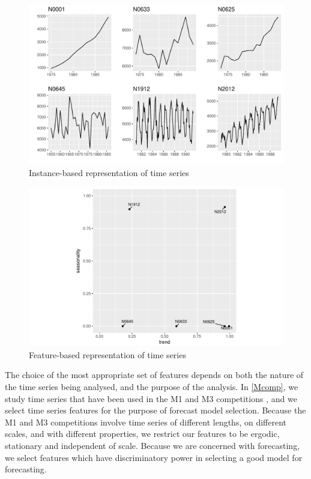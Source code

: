 \documentclass[11pt,a4paper,]{article}
\theoremstyle{definition}
\theoremstyle{definition}
\theoremstyle{definition}
\theoremstyle{remark}
\begin{document}
\begin{figure}

{\centering \includegraphics[width=\textwidth]{figure/fig1-1} 

}

\caption{Instance-based representation of time series}\label{fig:fig1}
\end{figure}

\begin{figure}

{\centering \includegraphics[width=0.7\linewidth]{figure/fig2-1} 

}

\caption{Feature-based representation of time series}\label{fig:fig2}
\end{figure}

The choice of the most appropriate set of features depends on both the
nature of the time series being analysed, and the purpose of the
analysis. In \autoref{Mcomp}, we study time series that have been used
in the M1 and M3 competitions
\autocites{makridakis1982accuracy}{makridakis2000m3}, and we select time
series features for the purpose of forecast model selection. Because the
M1 and M3 competitions involve time series of different lengths, on
different scales, and with different properties, we restrict our
features to be ergodic, stationary and independent of scale. Because we
are concerned with forecasting, we select features which have
discriminatory power in selecting a good model for forecasting.
\end{document}
